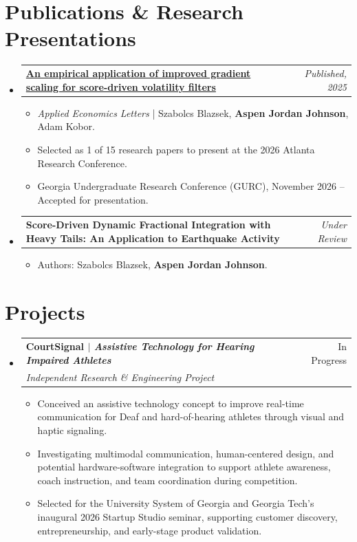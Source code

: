 \documentclass[letterpaper,11.000000001 pt]{article}
\makeatletter
\newcommand{\resumeItem}[1]{
  \item\small{
    {#1 \vspace{-1pt}}
  }
}
\newcommand{\resumeSubheading}[4]{
  \vspace{-1pt}\item
    \begin{tabular*}{0.97\textwidth}[t]{l@{\extracolsep{\fill}}r}
      \textbf{#1} & #2 \\
      \textit{\small#3} & \textit{\small #4} \\
    \end{tabular*}\vspace{-6pt}
}
\newcommand{\resumeProjectHeading}[2]{
  \item
  \begin{tabularx}{\linewidth}{@{}Xr@{}}
    \small #1 & \small #2 \\
  \end{tabularx}\vspace{-6pt}
}
\renewcommand{\resumeProjectHeading}[2]{
  \item
  \begin{tabularx}{\linewidth}{@{}>{\raggedright\arraybackslash}X@{\hspace{0.5em}}r@{}}
    \small #1 & \small #2 \\
  \end{tabularx}\vspace{-8pt}
}
\newcommand{\resumeSubHeadingListStart}{\begin{itemize}[leftmargin=0.15in, label={}]}
\newcommand{\resumeSubHeadingListEnd}{\end{itemize}}
\newcommand{\resumeItemListStart}{\begin{itemize}}
\newcommand{\resumeItemListEnd}{\end{itemize}\vspace{-5pt}}
\makeatother
\begin{document}
\section{Publications \& Research Presentations}
\resumeSubHeadingListStart

  \resumeProjectHeading
    {\href{https://doi.org/10.1080/13504851.2025.2606928}
      {\textbf{An empirical application of improved gradient scaling for score-driven volatility filters}}}
    {\textit{Published, 2025}}

  \resumeItemListStart
    \resumeItem{\textit{Applied Economics Letters} | 
      Szabolcs Blazsek, \textbf{Aspen Jordan Johnson}, Adam Kobor.}
    \resumeItem{Selected as 1 of 15 research papers to present at the 2026 Atlanta Research Conference.}
    \resumeItem{Georgia Undergraduate Research Conference (GURC), November 2026 -- Accepted for presentation.}
  \resumeItemListEnd

  \resumeProjectHeading
    {\textbf{Score-Driven Dynamic Fractional Integration with Heavy Tails:
    An Application to Earthquake Activity}}
    {\textit{Under Review}}

  \resumeItemListStart
    \resumeItem{Authors: Szabolcs Blazsek, \textbf{Aspen Jordan Johnson}.}
  \resumeItemListEnd

\resumeSubHeadingListEnd



\section{Projects}
    \resumeSubHeadingListStart
      \resumeSubheading
          {\textbf{CourtSignal} $|$ \emph{Assistive Technology for Hearing Impaired Athletes}}{In Progress}
          {Independent Research \& Engineering Project}{}
          \resumeItemListStart
            \resumeItem{Conceived an assistive technology concept to improve real-time communication for Deaf and hard-of-hearing athletes through visual and haptic signaling.}
            \resumeItem{Investigating multimodal communication, human-centered design, and potential hardware-software integration to support athlete awareness, coach instruction, and team coordination during competition.}
            \resumeItem{Selected for the University System of Georgia and Georgia Tech's inaugural 2026 Startup Studio seminar, supporting customer discovery, entrepreneurship, and early-stage product validation.}
          \resumeItemListEnd
    \resumeSubHeadingListEnd
\end{document}
